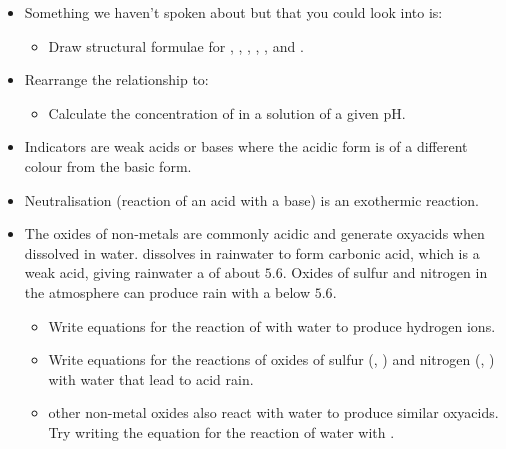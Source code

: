 \documentclass{article}
\begin{document}
\begin{itemize}

  \item Something we haven't spoken about but that you could look into is: 
    \begin{itemize}
      \item Draw structural formulae for , , , , , and .
    \end{itemize}
    
  \item Rearrange the relationship  to:
    \begin{itemize}
      \item Calculate the concentration of  in a solution of a  given pH. 
    \end{itemize}
  
  \item Indicators are weak acids or bases where the acidic form is of a
different colour from the basic form.

  \item Neutralisation (reaction of an acid with a base) is an exothermic reaction.

  \item The oxides of non-metals are commonly acidic and generate oxyacids when dissolved in water.  dissolves in rainwater to form
carbonic acid, which is a weak acid, giving
rainwater a  of about $5.6$. Oxides of sulfur and nitrogen in the atmosphere can produce rain with a 
below $5.6$.
    \begin{itemize}
      \item Write equations for the reaction of 
with water to produce hydrogen ions.
      \item Write equations for the reactions of
oxides of sulfur (, ) and nitrogen (, ) with water
that lead to acid rain.
      \item other non-metal oxides also react with water to produce similar oxyacids. Try writing the equation for the reaction of water with .
    \end{itemize}
    
\end{itemize}
\end{document}
